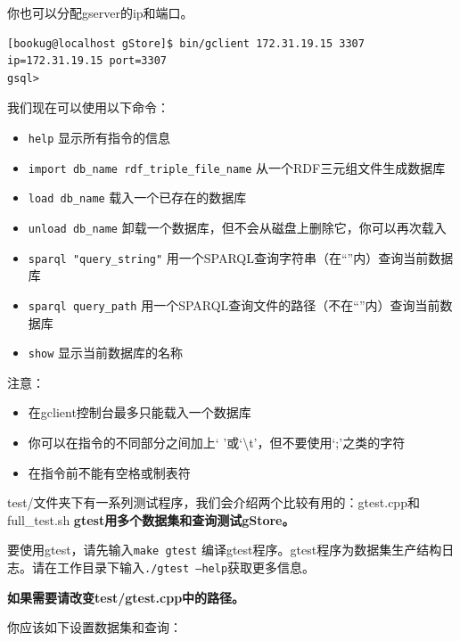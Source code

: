 \documentclass[titlepage, a4paper, 12pt]{article}
\begin{document}
你也可以分配gserver的ip和端口。

\begin{verbatim}
[bookug@localhost gStore]$ bin/gclient 172.31.19.15 3307
ip=172.31.19.15 port=3307
gsql>
\end{verbatim}

我们现在可以使用以下命令：

\begin{itemize}
	\item
	\texttt{help} 显示所有指令的信息
	\item
	\texttt{import\ db\_name\ rdf\_triple\_file\_name} 从一个RDF三元组文件生成数据库
	\item
	\texttt{load\ db\_name} 载入一个已存在的数据库
	\item
	\texttt{unload\ db\_name} 卸载一个数据库，但不会从磁盘上删除它，你可以再次载入
	\item
	\texttt{sparql\ "query\_string"} 用一个SPARQL查询字符串（在``''内）查询当前数据库
	\item
	\texttt{sparql\ query\_path} 用一个SPARQL查询文件的路径（不在``''内）查询当前数据库
	\item
	\texttt{show} 显示当前数据库的名称
\end{itemize}

注意：

\begin{itemize}
	\item
	在gclient控制台最多只能载入一个数据库
	\item
	你可以在指令的不同部分之间加上` '或`\textbackslash{}t'，但不要使用`;'之类的字符
	\item
	在指令前不能有空格或制表符
\end{itemize}


test/文件夹下有一系列测试程序，我们会介绍两个比较有用的：gtest.cpp和full\_test.sh
\textbf{gtest用多个数据集和查询测试gStore。}

要使用gtest，请先输入\texttt{make\ gtest} 编译gtest程序。gtest程序为数据集生产结构日志。请在工作目录下输入\texttt{./gtest\ --help}获取更多信息。

\textbf{如果需要请改变test/gtest.cpp中的路径。}

你应该如下设置数据集和查询：
\end{document}
